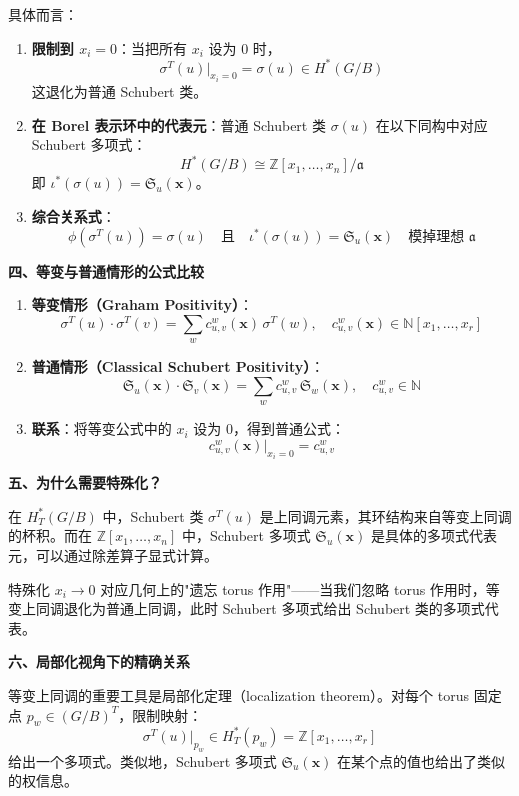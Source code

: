 具体而言：

\begin{enumerate}
\item \textbf{限制到 $x_i=0$}：当把所有 $x_i$ 设为 0 时，
$$\sigma^T(u)|_{x_i=0} = \sigma(u) \in H^*(G/B)$$
这退化为普通 Schubert 类。

\item \textbf{在 Borel 表示环中的代表元}：普通 Schubert 类 $\sigma(u)$ 在以下同构中对应 Schubert 多项式：
$$H^*(G/B) \cong \mathbb{Z}[x_1,\ldots,x_n]/\mathfrak{a}$$
即 $\iota^*(\sigma(u)) = \mathfrak{S}_u(\mathbf{x})$。

\item \textbf{综合关系式}：
$$\phi(\sigma^T(u)) = \sigma(u) \quad \text{且} \quad \iota^*(\sigma(u)) = \mathfrak{S}_u(\mathbf{x}) \quad \text{模掉理想 } \mathfrak{a}$$
\end{enumerate}

\textbf{四、等变与普通情形的公式比较}

\begin{enumerate}
\item \textbf{等变情形（Graham Positivity）}：
$$\sigma^T(u) \cdot \sigma^T(v) = \sum_w c_{u,v}^w(\mathbf{x}) \, \sigma^T(w), \quad c_{u,v}^w(\mathbf{x}) \in \mathbb{N}[x_1,\ldots,x_r]$$

\item \textbf{普通情形（Classical Schubert Positivity）}：
$$\mathfrak{S}_u(\mathbf{x}) \cdot \mathfrak{S}_v(\mathbf{x}) = \sum_w c_{u,v}^w \, \mathfrak{S}_w(\mathbf{x}), \quad c_{u,v}^w \in \mathbb{N}$$

\item \textbf{联系}：将等变公式中的 $x_i$ 设为 0，得到普通公式：
$$c_{u,v}^w(\mathbf{x})|_{x_i=0} = c_{u,v}^w$$
\end{enumerate}

\textbf{五、为什么需要特殊化？}

在 $H_T^*(G/B)$ 中，Schubert 类 $\sigma^T(u)$ 是上同调元素，其环结构来自等变上同调的杯积。而在 $\mathbb{Z}[x_1,\ldots,x_n]$ 中，Schubert 多项式 $\mathfrak{S}_u(\mathbf{x})$ 是具体的多项式代表元，可以通过除差算子显式计算。

特殊化 $x_i \to 0$ 对应几何上的"遗忘 torus 作用"——当我们忽略 torus 作用时，等变上同调退化为普通上同调，此时 Schubert 多项式给出 Schubert 类的多项式代表。

\textbf{六、局部化视角下的精确关系}

等变上同调的重要工具是局部化定理（localization theorem）。对每个 torus 固定点 $p_w \in (G/B)^T$，限制映射：
$$\sigma^T(u)|_{p_w} \in H_T^*(p_w) = \mathbb{Z}[x_1,\ldots,x_r]$$
给出一个多项式。类似地，Schubert 多项式 $\mathfrak{S}_u(\mathbf{x})$ 在某个点的值也给出了类似的权信息。

